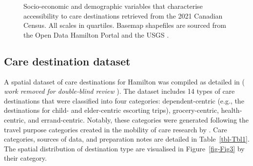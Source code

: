 \documentclass[
  authoryear,
  preprint,
  3p]{elsarticle}
\begin{document}
\begin{figure}


\caption{\label{fig-Fig2}Socio-economic and demographic variables that
characterise accessibility to care destinations retrieved from the 2021
Canadian Census. All scales in quartiles. Basemap shapefiles are sourced
from the Open Data Hamilton Portal
\citep{opendatahamiltonCityBoundary2023} and the USGS
\citep{greatlakesUSGS2010}.}

\end{figure}%

\newpage

\subsection{Care destination dataset}\label{care-destination-dataset}

A spatial dataset of care destinations for Hamilton was compiled as
detailed in ( \emph{work removed for double-blind review} ). The dataset
includes 14 types of care destinations that were classified into four
categories: dependent-centric (e.g., the destinations for child- and
elder-centric escorting trips), grocery-centric, health-centric, and
errand-centric. Notably, these categories were generated following the
travel purpose categories created in the mobility of care research by
\citet{sanchezdemadariagaMeasuringMobilitiesCare2019}. Care categories,
sources of data, and preparation notes are detailed in
Table~\ref{tbl-Tbl1}. The spatial distribution of destination type are
visualised in Figure~\ref{fig-Fig3} by their category.
\end{document}
